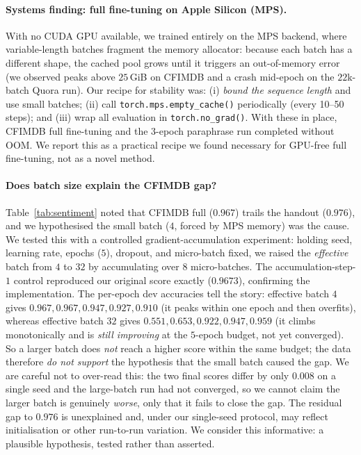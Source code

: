 \documentclass[10pt,twocolumn]{article}
\begin{document}
\paragraph{Systems finding: full fine-tuning on Apple Silicon (MPS).}
With no CUDA GPU available, we trained entirely on the MPS backend, where
variable-length batches fragment the memory allocator: because each batch has a
different shape, the cached pool grows until it triggers an out-of-memory error
(we observed peaks above $25$\,GiB on CFIMDB and a crash mid-epoch on the
$22$k-batch Quora run). Our recipe for stability was: (i) \emph{bound the
sequence length} and use small batches; (ii) call
\texttt{torch.mps.empty\_cache()} periodically (every 10--50 steps); and (iii)
wrap all evaluation in \texttt{torch.no\_grad()}. With these in place, CFIMDB
full fine-tuning and the 3-epoch paraphrase run completed without OOM. We report
this as a practical recipe we found necessary for GPU-free full fine-tuning, not
as a novel method.

\paragraph{Does batch size explain the CFIMDB gap?}
Table~\ref{tab:sentiment} noted that CFIMDB full ($0.967$) trails the handout
($0.976$), and we hypothesised the small batch ($4$, forced by MPS memory) was the
cause. We tested this with a controlled gradient-accumulation experiment: holding
seed, learning rate, epochs ($5$), dropout, and micro-batch fixed, we raised the
\emph{effective} batch from $4$ to $32$ by accumulating over $8$ micro-batches. The
accumulation-step-$1$ control reproduced our original score exactly ($0.9673$),
confirming the implementation. The per-epoch dev accuracies tell the story: effective
batch $4$ gives $0.967, 0.967, 0.947, 0.927, 0.910$ (it peaks within one epoch and
then overfits), whereas effective batch $32$ gives $0.551, 0.653, 0.922, 0.947,
0.959$ (it climbs monotonically and is \emph{still improving} at the $5$-epoch budget,
not yet converged). So a larger batch does \emph{not} reach a higher score within the
same budget; the data therefore \emph{do not support} the hypothesis that the small
batch caused the gap. We are careful not to over-read this: the two final scores
differ by only $0.008$ on a single seed and the large-batch run had not converged, so
we cannot claim the larger batch is genuinely \emph{worse}, only that it fails to
close the gap. The residual gap to $0.976$ is unexplained and, under our single-seed
protocol, may reflect initialisation or other run-to-run variation. We consider this
informative: a plausible hypothesis, tested rather than asserted.
\end{document}
